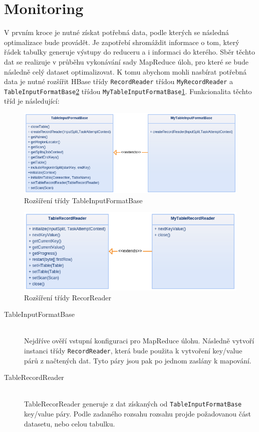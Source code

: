 \documentclass[thesis=M,czech]{FITthesis}[2012/06/26]
\begin{document}
\section{Monitoring}
V prvním kroce je nutné získat potřebná data, podle kterých se následná optimalizace bude provádět. Je zapotřebí shromáždit informace o tom, který řádek tabulky generuje výstupy do reduceru a i informaci do kterého. Sběr těchto dat se realizuje v průběhu vykonávání sady MapReduce úloh, pro které se bude následně celý dataset optimalizovat. K tomu abychom mohli nasbírat potřebná data je nutné rozšířit HBase třídy \texttt{RecordReader} třídou \texttt{MyRecordReader} a \texttt{TableInputFormatBase}\ref{fig:record} třídou \texttt{MyTableInputFormatBase}\ref{fig:input}. Funkcionalita těchto tříd je následující:

\begin{figure}\centering
	\includegraphics[width=1\textwidth, angle=0]{files/input}
	\caption[Rozšíření třídy TableInputFormatBase]
	{Rozšíření třídy TableInputFormatBase}\label{fig:input}
\end{figure} 

\begin{figure}\centering
	\includegraphics[width=1\textwidth, angle=0]{files/record}
	\caption[Rozšíření třídy RecorReader]
	{Rozšíření třídy RecorReader}\label{fig:record}
\end{figure} 

\begin{description}
\item[TableInputFormatBase] \hfill \\
Nejdříve ověří vstupní konfiguraci pro MapReduce úlohu. Následně vytvoří instanci třídy \texttt{RecordReader}, která bude použita k vytvoření key/value párů z načtených dat. Tyto páry jsou pak po jednom zaslány k mapování.

\item[TableRecordReader] \hfill \\
TableRecorReader generuje z dat získaných od \texttt{TableInputFormatBase} key/value páry. Podle zadaného rozsahu rozsahu projde požadovanou část datasetu, nebo celou tabulku. 
\end{description}
\end{document}
